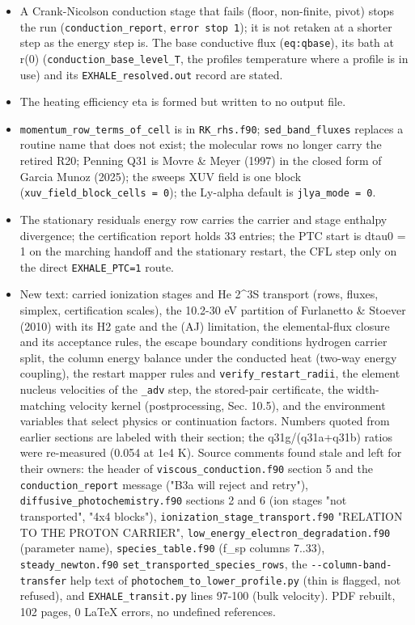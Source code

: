 \documentclass[english,a4paper]{my_memo}
\providecommand{\tightlist}{\setlength{\itemsep}{0pt}\setlength{\parskip}{0pt}}
\begin{document}
\begin{itemize}
\tightlist
\item
  A Crank-Nicolson conduction stage that fails (floor, non-finite, pivot) stops
  the run (\texttt{conduction\_report}, \texttt{error\ stop\ 1}); it is not retaken at a shorter
  step as the energy step is. The base conductive flux (\texttt{eq:qbase}), its bath
  at r(0) (\texttt{conduction\_base\_level\_T}, the profile\textquotesingle s temperature where a profile
  is in use) and its \texttt{EXHALE\_resolved.out} record are stated.
\item
  The heating efficiency eta is formed but written to no output file.
\item
  \texttt{momentum\_row\_terms\_of\_cell} is in \texttt{RK\_rhs.f90}; \texttt{sed\_band\_fluxes} replaces a
  routine name that does not exist; the molecular rows no longer carry the
  retired R20; Penning Q31 is Movre \& Meyer (1997) in the closed form of
  Garcia Munoz (2025); the sweep\textquotesingle s XUV field is one block
  (\texttt{xuv\_field\_block\_cells\ =\ 0}); the Ly-alpha default is \texttt{jlya\_mode\ =\ 0}.
\item
  The stationary residual\textquotesingle s energy row carries the carrier and stage enthalpy
  divergence; the certification report holds 33 entries; the PTC start is
  dtau0 = 1 on the marching handoff and the stationary restart, the CFL step
  only on the direct \texttt{EXHALE\_PTC=1} route.
\item
  New text: carried ionization stages and He 2\^{}3S transport (rows, fluxes,
  simplex, certification scales), the 10.2-30 eV partition of Furlanetto \&
  Stoever (2010) with its H2 gate and the (AJ) limitation, the elemental-flux
  closure and its acceptance rules, the escape boundary condition\textquotesingle s hydrogen
  carrier split, the column energy balance under the conducted heat (two-way
  energy coupling), the restart mapper rules and \texttt{verify\_restart\_radii}, the
  element nucleus velocities of the \texttt{\_adv} step, the stored-pair certificate,
  the width-matching velocity kernel (postprocessing, Sec. 10.5), and the
  environment variables that select physics or continuation factors.
  Numbers quoted from earlier sections are labeled with their section; the
  q31g/(q31a+q31b) ratios were re-measured (0.054 at 1e4 K). Source comments
  found stale and left for their owners: the header of \texttt{viscous\_conduction.f90}
  section 5 and the \texttt{conduction\_report} message ("B3a will reject and retry"),
  \texttt{diffusive\_photochemistry.f90} sections 2 and 6 (ion stages "not
  transported", "4x4 blocks"), \texttt{ionization\_stage\_transport.f90} "RELATION TO THE
  PROTON CARRIER", \texttt{low\_energy\_electron\_degradation.f90} (parameter name),
  \texttt{species\_table.f90} (f\_sp columns 7..33), \texttt{steady\_newton.f90}
  \texttt{set\_transported\_species\_rows}, the \texttt{-\/-column-band-transfer} help text of
  \texttt{photochem\_to\_lower\_profile.py} (thin is flagged, not refused), and
  \texttt{EXHALE\_transit.py} lines 97-100 (bulk velocity). PDF rebuilt, 102 pages,
  0 LaTeX errors, no undefined references.
\end{itemize}
\end{document}

